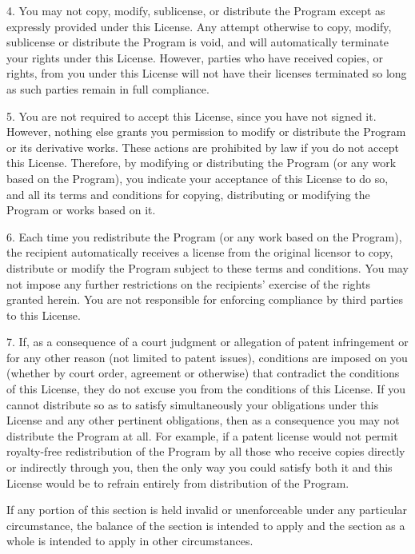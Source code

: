 \documentclass[11pt,a4paper]{article}
\begin{document}
\begin{itemize}
		4. You may not copy, modify, sublicense, or distribute the Program
		except as expressly provided under this License.  Any attempt
		otherwise to copy, modify, sublicense or distribute the Program is
		void, and will automatically terminate your rights under this License.
		However, parties who have received copies, or rights, from you under
		this License will not have their licenses terminated so long as such
		parties remain in full compliance.

		5. You are not required to accept this License, since you have not
		signed it.  However, nothing else grants you permission to modify or
		distribute the Program or its derivative works.  These actions are
		prohibited by law if you do not accept this License.  Therefore, by
		modifying or distributing the Program (or any work based on the
		Program), you indicate your acceptance of this License to do so, and
		all its terms and conditions for copying, distributing or modifying
		the Program or works based on it.

		6. Each time you redistribute the Program (or any work based on the
		Program), the recipient automatically receives a license from the
		original licensor to copy, distribute or modify the Program subject to
		these terms and conditions.  You may not impose any further
		restrictions on the recipients' exercise of the rights granted herein.
		You are not responsible for enforcing compliance by third parties to
		this License.

		7. If, as a consequence of a court judgment or allegation of patent
		infringement or for any other reason (not limited to patent issues),
		conditions are imposed on you (whether by court order, agreement or
		otherwise) that contradict the conditions of this License, they do not
		excuse you from the conditions of this License.  If you cannot
		distribute so as to satisfy simultaneously your obligations under this
		License and any other pertinent obligations, then as a consequence you
		may not distribute the Program at all.  For example, if a patent
		license would not permit royalty-free redistribution of the Program by
		all those who receive copies directly or indirectly through you, then
		the only way you could satisfy both it and this License would be to
		refrain entirely from distribution of the Program.

		If any portion of this section is held invalid or unenforceable under
		any particular circumstance, the balance of the section is intended to
		apply and the section as a whole is intended to apply in other
		circumstances.


\end{itemize}
\end{document}
